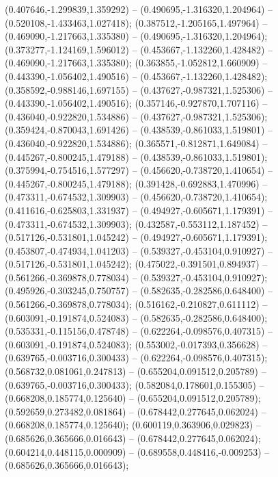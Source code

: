  (0.407646,-1.299839,1.359292) -- (0.490695,-1.316320,1.204964) -- (0.520108,-1.433463,1.027418);
 (0.387512,-1.205165,1.497964) -- (0.469090,-1.217663,1.335380) -- (0.490695,-1.316320,1.204964);
 (0.373277,-1.124169,1.596012) -- (0.453667,-1.132260,1.428482) -- (0.469090,-1.217663,1.335380);
 (0.363855,-1.052812,1.660909) -- (0.443390,-1.056402,1.490516) -- (0.453667,-1.132260,1.428482);
 (0.358592,-0.988146,1.697155) -- (0.437627,-0.987321,1.525306) -- (0.443390,-1.056402,1.490516);
 (0.357146,-0.927870,1.707116) -- (0.436040,-0.922820,1.534886) -- (0.437627,-0.987321,1.525306);
 (0.359424,-0.870043,1.691426) -- (0.438539,-0.861033,1.519801) -- (0.436040,-0.922820,1.534886);
 (0.365571,-0.812871,1.649084) -- (0.445267,-0.800245,1.479188) -- (0.438539,-0.861033,1.519801);
 (0.375994,-0.754516,1.577297) -- (0.456620,-0.738720,1.410654) -- (0.445267,-0.800245,1.479188);
 (0.391428,-0.692883,1.470996) -- (0.473311,-0.674532,1.309903) -- (0.456620,-0.738720,1.410654);
 (0.411616,-0.625803,1.331937) -- (0.494927,-0.605671,1.179391) -- (0.473311,-0.674532,1.309903);
 (0.432587,-0.553112,1.187452) -- (0.517126,-0.531801,1.045242) -- (0.494927,-0.605671,1.179391);
 (0.453807,-0.474934,1.041203) -- (0.539327,-0.453104,0.910927) -- (0.517126,-0.531801,1.045242);
 (0.475022,-0.391501,0.894937) -- (0.561266,-0.369878,0.778034) -- (0.539327,-0.453104,0.910927);
 (0.495926,-0.303245,0.750757) -- (0.582635,-0.282586,0.648400) -- (0.561266,-0.369878,0.778034);
 (0.516162,-0.210827,0.611112) -- (0.603091,-0.191874,0.524083) -- (0.582635,-0.282586,0.648400);
 (0.535331,-0.115156,0.478748) -- (0.622264,-0.098576,0.407315) -- (0.603091,-0.191874,0.524083);
 (0.553002,-0.017393,0.356628) -- (0.639765,-0.003716,0.300433) -- (0.622264,-0.098576,0.407315);
 (0.568732,0.081061,0.247813) -- (0.655204,0.091512,0.205789) -- (0.639765,-0.003716,0.300433);
 (0.582084,0.178601,0.155305) -- (0.668208,0.185774,0.125640) -- (0.655204,0.091512,0.205789);
 (0.592659,0.273482,0.081864) -- (0.678442,0.277645,0.062024) -- (0.668208,0.185774,0.125640);
 (0.600119,0.363906,0.029823) -- (0.685626,0.365666,0.016643) -- (0.678442,0.277645,0.062024);
 (0.604214,0.448115,0.000909) -- (0.689558,0.448416,-0.009253) -- (0.685626,0.365666,0.016643);
